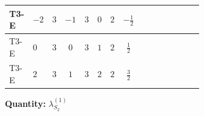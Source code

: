 \documentclass[8pt]{article}
\begin{document}
\begin{landscape}
\begin{longtable}{@{}llcccccc >{\raggedright\arraybackslash}p{0.21\linewidth} >{\raggedright\arraybackslash}p{0.21\linewidth} >{\raggedright\arraybackslash}p{0.21\linewidth}@{}}
T3-E & $-2$ & $3$ & $-1$ & $3$ & $0$ & $2$ & $-\frac{1}{2}$ & \scriptsize\adjustbox{max width=\linewidth}{$\begin{gathered} {\lambda_{S_2}^{(1)}} (4 T_{\nu}^{(2)}+14 {\lambda_{S_2}^{(A)}})\end{gathered}$} & \scriptsize\adjustbox{max width=\linewidth}{$\begin{gathered} +2 {\lambda_{S_2}^{(A)}} T_{\nu}^{(2)}\end{gathered}$} & \scriptsize\adjustbox{max width=\linewidth}{$\begin{gathered} -3 \operatorname{Tr}\!\left({y_2}\,\left({y_2}\right)^{\dagger}\,{y_2}\,\left({y_2}\right)^{\dagger}\right)\end{gathered}$} \\
\midrule
T3-E & $0$ & $3$ & $0$ & $3$ & $1$ & $2$ & $\frac{1}{2}$ & \scriptsize\adjustbox{max width=\linewidth}{$\begin{gathered} {\lambda_{S_2}^{(1)}} (4 T_{\nu}^{(2)}+14 {\lambda_{S_2}^{(A)}})\end{gathered}$} & \scriptsize\adjustbox{max width=\linewidth}{$\begin{gathered} +2 {\lambda_{S_2}^{(A)}} T_{\nu}^{(2)}\end{gathered}$} & \scriptsize\adjustbox{max width=\linewidth}{$\begin{gathered} -3 \operatorname{Tr}\!\left({y_2}\,\left({y_2}\right)^{\dagger}\,{y_2}\,\left({y_2}\right)^{\dagger}\right)\end{gathered}$} \\
\midrule
T3-E & $2$ & $3$ & $1$ & $3$ & $2$ & $2$ & $\frac{3}{2}$ & \scriptsize\adjustbox{max width=\linewidth}{$\begin{gathered} {\lambda_{S_2}^{(1)}} (4 T_{\nu}^{(2)}+14 {\lambda_{S_2}^{(A)}})\end{gathered}$} & \scriptsize\adjustbox{max width=\linewidth}{$\begin{gathered} +2 {\lambda_{S_2}^{(A)}} T_{\nu}^{(2)}\end{gathered}$} & \scriptsize\adjustbox{max width=\linewidth}{$\begin{gathered} -3 \operatorname{Tr}\!\left({y_2}\,\left({y_2}\right)^{\dagger}\,{y_2}\,\left({y_2}\right)^{\dagger}\right)\end{gathered}$} \\
\midrule
\bottomrule
\end{longtable}
\clearpage
\noindent\textbf{Quantity: }$\lambda_{S_2}^{(1)}$\par\smallskip

\end{landscape}
\end{document}
